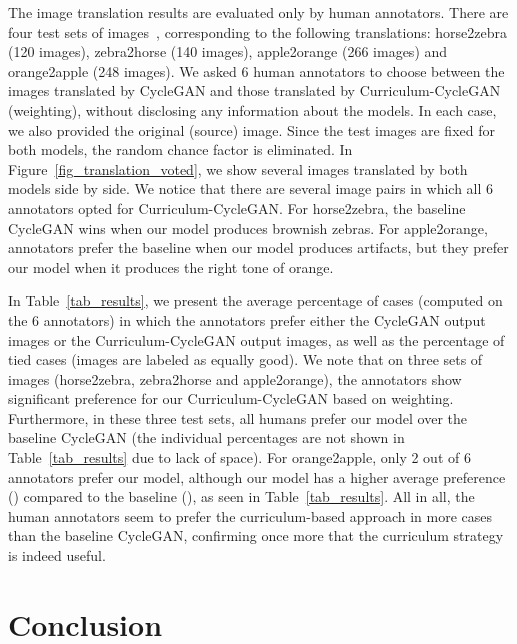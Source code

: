 \documentclass[10pt,twocolumn,letterpaper]{article}
\begin{document}
The image translation results are evaluated only by human annotators. There are four test sets of images~\cite{Zhu-ICCV-2017}, corresponding to the following translations: horse2zebra (120 images), zebra2horse (140 images), apple2orange (266 images) and orange2apple (248 images). We asked 6 human annotators to choose between the images translated by CycleGAN and those translated by Curriculum-CycleGAN (weighting), without disclosing any information about the models. In each case, we also provided the original (source) image. Since the test images are fixed for both models, the random chance factor is eliminated. In Figure~\ref{fig_translation_voted}, we show several images translated by both models side by side. We notice that there are several image pairs in which all 6 annotators opted for Curriculum-CycleGAN. For horse2zebra, the baseline CycleGAN wins when our model produces brownish zebras. For apple2orange, annotators prefer the baseline when our model produces artifacts, but they prefer our model when it produces the right tone of orange. 

In Table~\ref{tab_results}, we present the average percentage of cases (computed on the 6 annotators) in which the annotators prefer either the CycleGAN output images or the Curriculum-CycleGAN output images, as well as the percentage of tied cases (images are labeled as equally good). We note that on three sets of images (horse2zebra, zebra2horse and apple2orange), the annotators show significant preference for our Curriculum-CycleGAN based on weighting. Furthermore, in these three test sets, all humans prefer our model over the baseline CycleGAN (the individual percentages are not shown in Table~\ref{tab_results} due to lack of space). For orange2apple, only 2 out of 6 annotators prefer our model, although our model has a higher average preference () compared to the baseline (), as seen in Table~\ref{tab_results}. All in all, the human annotators seem to prefer the curriculum-based approach in  more cases than the baseline CycleGAN, confirming once more that the curriculum strategy is indeed useful. 

\vspace{-0.2cm}
\section{Conclusion}
\label{sec_Conclusion}
\vspace{-0.1cm}
\end{document}

